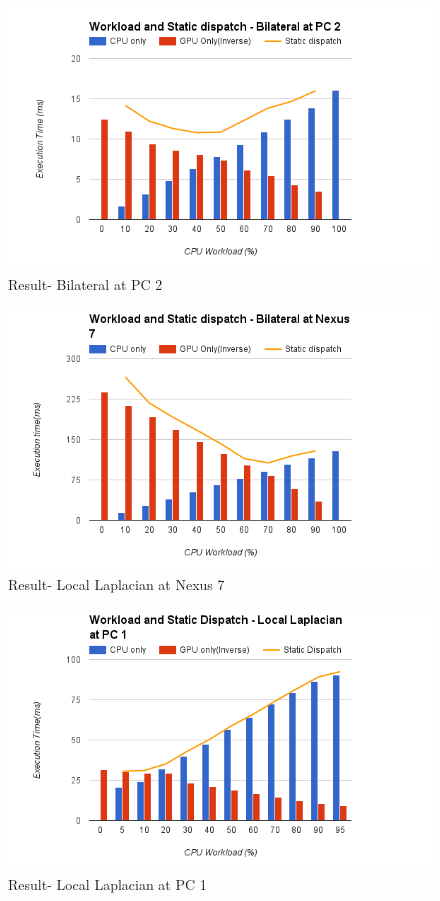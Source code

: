 \begin{figure}
\centering
\includegraphics[width=12cm]{img/Result-WorkloadAndStaticDispatch(Bilateral@PC2)}
\caption{Result- Bilateral at PC 2 }
\label{fig:my_label}
\end{figure}


\begin{figure}[hbtp]
\centering
\includegraphics[width=12cm]{img/Result-WorkloadAndStaticDispatch(Bilateral@Nexus7)}
\caption{Result- Local Laplacian at Nexus 7 }
\label{fig:my_label}
\end{figure}

\begin{figure}[hbtp]
\centering
\includegraphics[width=12cm]{img/Result-WorkloadAndStaticDispatch(LocalLaplacian@PC1)}
\caption{Result- Local Laplacian at PC 1}
\label{fig:my_label}
\end{figure}

